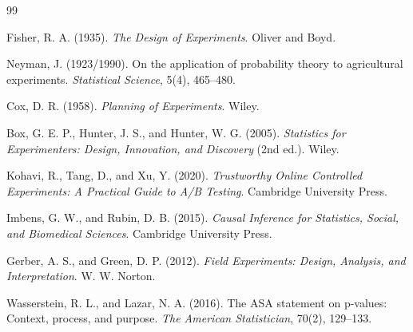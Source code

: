 \documentclass[UTF8,fontset=fandol,openany,zihao=-4]{ctexbook}
\begin{document}
\begin{thebibliography}{99}
\raggedright
{}
Fisher, R. A. (1935).
\emph{The Design of Experiments}.
Oliver and Boyd.

Neyman, J. (1923/1990).
On the application of probability theory to agricultural experiments.
\emph{Statistical Science}, 5(4), 465--480.

Cox, D. R. (1958).
\emph{Planning of Experiments}.
Wiley.

Box, G. E. P., Hunter, J. S., and Hunter, W. G. (2005).
\emph{Statistics for Experimenters: Design, Innovation, and Discovery} (2nd ed.).
Wiley.

Kohavi, R., Tang, D., and Xu, Y. (2020).
\emph{Trustworthy Online Controlled Experiments: A Practical Guide to A/B Testing}.
Cambridge University Press.

Imbens, G. W., and Rubin, D. B. (2015).
\emph{Causal Inference for Statistics, Social, and Biomedical Sciences}.
Cambridge University Press.

Gerber, A. S., and Green, D. P. (2012).
\emph{Field Experiments: Design, Analysis, and Interpretation}.
W. W. Norton.

Wasserstein, R. L., and Lazar, N. A. (2016).
The ASA statement on p-values: Context, process, and purpose.
\emph{The American Statistician}, 70(2), 129--133.
\end{thebibliography}
\end{document}
